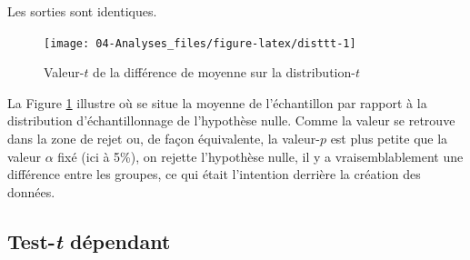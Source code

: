 \documentclass[
]{book}
\newenvironment{Shaded}{}{}
\newcommand{\CommentTok}[1]{\textit{#1}}
\newcommand{\FunctionTok}[1]{#1}
\newcommand{\NormalTok}[1]{#1}
\begin{document}
\begin{Shaded}
\end{Shaded}

Les sorties sont identiques.

\begin{figure}

{\centering \texttt{[image: 04-Analyses\_files/figure-latex/disttt-1]} 

}

\caption{Valeur-$t$ de la différence de moyenne sur la distribution-$t$}\label{fig:disttt}
\end{figure}

La Figure \ref{fig:disttt} illustre où se situe la moyenne de l'échantillon par rapport à la distribution d'échantillonnage de l'hypothèse nulle. Comme la valeur se retrouve dans la zone de rejet ou, de façon équivalente, la valeur-\(p\) est plus petite que la valeur \(\alpha\) fixé (ici à 5\%), on rejette l'hypothèse nulle, il y a vraisemblablement une différence entre les groupes, ce qui était l'intention derrière la création des données.

\hypertarget{test-t-duxe9pendant}{%
\subsection{\texorpdfstring{Test-\emph{t} dépendant}{Test-t dépendant}}\label{test-t-duxe9pendant}}
\end{document}
